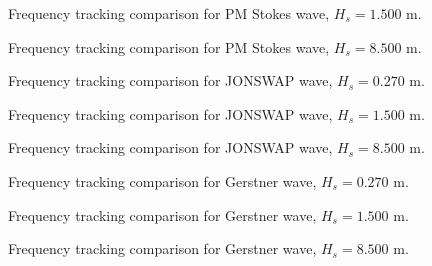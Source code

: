 \documentclass[11pt,letterpaper]{article}
\begin{document}
\begin{figure}[H]\centering
  \resizebox{\textwidth}{!}{}
  \caption{Frequency tracking comparison for PM Stokes wave, $H_s = 1.500$ m.}
  \label{fig:freqtrack_pmstokes_medium}
\end{figure}

\begin{figure}[H]\centering
  \resizebox{\textwidth}{!}{}
  \caption{Frequency tracking comparison for PM Stokes wave, $H_s = 8.500$ m.}
  \label{fig:freqtrack_pmstokes_high}
\end{figure}

\begin{figure}[H]\centering
  \resizebox{\textwidth}{!}{}
  \caption{Frequency tracking comparison for JONSWAP wave, $H_s = 0.270$ m.}
  \label{fig:freqtrack_jonswap_low}
\end{figure}

\begin{figure}[H]\centering
  \resizebox{\textwidth}{!}{}
  \caption{Frequency tracking comparison for JONSWAP wave, $H_s = 1.500$ m.}
  \label{fig:freqtrack_jonswap_medium}
\end{figure}

\begin{figure}[H]\centering
  \resizebox{\textwidth}{!}{}
  \caption{Frequency tracking comparison for JONSWAP wave, $H_s = 8.500$ m.}
  \label{fig:freqtrack_jonswap_high}
\end{figure}

\begin{figure}[H]\centering
  \resizebox{\textwidth}{!}{}
  \caption{Frequency tracking comparison for Gerstner wave, $H_s = 0.270$ m.}
  \label{fig:freqtrack_gerstner_low}
\end{figure}

\begin{figure}[H]\centering
  \resizebox{\textwidth}{!}{}
  \caption{Frequency tracking comparison for Gerstner wave, $H_s = 1.500$ m.}
  \label{fig:freqtrack_gerstner_medium}
\end{figure}

\begin{figure}[H]\centering
  \resizebox{\textwidth}{!}{}
  \caption{Frequency tracking comparison for Gerstner wave, $H_s = 8.500$ m.}
  \label{fig:freqtrack_gerstner_high}
\end{figure}
\end{document}
